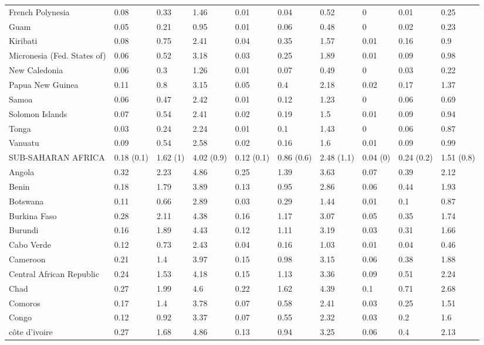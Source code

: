 \begin{longtable}[t]{llllllllll}
French Polynesia & 0.08 & 0.33 & 1.46 & 0.01 & 0.04 & 0.52 & 0 & 0.01 & 0.25\\
Guam & 0.05 & 0.21 & 0.95 & 0.01 & 0.06 & 0.48 & 0 & 0.02 & 0.23\\
Kiribati & 0.08 & 0.75 & 2.41 & 0.04 & 0.35 & 1.57 & 0.01 & 0.16 & 0.9\\
Micronesia (Fed. States of) & 0.06 & 0.52 & 3.18 & 0.03 & 0.25 & 1.89 & 0.01 & 0.09 & 0.98\\
New Caledonia & 0.06 & 0.3 & 1.26 & 0.01 & 0.07 & 0.49 & 0 & 0.03 & 0.22\\
Papua New Guinea & 0.11 & 0.8 & 3.15 & 0.05 & 0.4 & 2.18 & 0.02 & 0.17 & 1.37\\
Samoa & 0.06 & 0.47 & 2.42 & 0.01 & 0.12 & 1.23 & 0 & 0.06 & 0.69\\
Solomon Islands & 0.07 & 0.54 & 2.41 & 0.02 & 0.19 & 1.5 & 0.01 & 0.09 & 0.94\\
Tonga & 0.03 & 0.24 & 2.24 & 0.01 & 0.1 & 1.43 & 0 & 0.06 & 0.87\\
Vanuatu & 0.09 & 0.54 & 2.58 & 0.02 & 0.16 & 1.6 & 0.01 & 0.09 & 0.99\\
SUB-SAHARAN AFRICA & 0.18 (0.1) & 1.62 (1) & 4.02 (0.9) & 0.12 (0.1) & 0.86 (0.6) & 2.48 (1.1) & 0.04 (0) & 0.24 (0.2) & 1.51 (0.8)\\
Angola & 0.32 & 2.23 & 4.86 & 0.25 & 1.39 & 3.63 & 0.07 & 0.39 & 2.12\\
Benin & 0.18 & 1.79 & 3.89 & 0.13 & 0.95 & 2.86 & 0.06 & 0.44 & 1.93\\
Botswana & 0.11 & 0.66 & 2.89 & 0.03 & 0.29 & 1.44 & 0.01 & 0.1 & 0.87\\
Burkina Faso & 0.28 & 2.11 & 4.38 & 0.16 & 1.17 & 3.07 & 0.05 & 0.35 & 1.74\\
Burundi & 0.16 & 1.89 & 4.43 & 0.12 & 1.11 & 3.19 & 0.03 & 0.31 & 1.66\\
Cabo Verde & 0.12 & 0.73 & 2.43 & 0.04 & 0.16 & 1.03 & 0.01 & 0.04 & 0.46\\
Cameroon & 0.21 & 1.4 & 3.97 & 0.15 & 0.98 & 3.15 & 0.06 & 0.38 & 1.88\\
Central African Republic & 0.24 & 1.53 & 4.18 & 0.15 & 1.13 & 3.36 & 0.09 & 0.51 & 2.24\\
Chad & 0.27 & 1.99 & 4.6 & 0.22 & 1.62 & 4.39 & 0.1 & 0.71 & 2.68\\
Comoros & 0.17 & 1.4 & 3.78 & 0.07 & 0.58 & 2.41 & 0.03 & 0.25 & 1.51\\
Congo & 0.12 & 0.92 & 3.37 & 0.07 & 0.55 & 2.32 & 0.03 & 0.2 & 1.6\\
côte d'ivoire & 0.27 & 1.68 & 4.86 & 0.13 & 0.94 & 3.25 & 0.06 & 0.4 & 2.13\\

\end{longtable}
